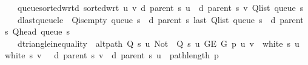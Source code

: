 \begin{isabellebody}
\ \ \ queue{\isacharunderscore}{\kern0pt}sorted{\isacharunderscore}{\kern0pt}wrt{\isacharunderscore}{\kern0pt}d{\isacharcolon}{\kern0pt}\ {\isachardoublequoteopen}sorted{\isacharunderscore}{\kern0pt}wrt\ {\isacharparenleft}{\kern0pt}{\isasymlambda}u\ v{\isachardot}{\kern0pt}\ d\ {\isacharparenleft}{\kern0pt}parent\ s{\isacharparenright}{\kern0pt}\ u\ {\isasymle}\ d\ {\isacharparenleft}{\kern0pt}parent\ s{\isacharparenright}{\kern0pt}\ v{\isacharparenright}{\kern0pt}\ {\isacharparenleft}{\kern0pt}Q{\isacharunderscore}{\kern0pt}list\ {\isacharparenleft}{\kern0pt}queue\ s{\isacharparenright}{\kern0pt}{\isacharparenright}{\kern0pt}{\isachardoublequoteclose}\isanewline
\ \ \ d{\isacharunderscore}{\kern0pt}last{\isacharunderscore}{\kern0pt}queue{\isacharunderscore}{\kern0pt}le{\isacharcolon}{\kern0pt}\ {\isachardoublequoteopen}{\isasymnot}\ Q{\isacharunderscore}{\kern0pt}is{\isacharunderscore}{\kern0pt}empty\ {\isacharparenleft}{\kern0pt}queue\ s{\isacharparenright}{\kern0pt}\ {\isasymLongrightarrow}\ d\ {\isacharparenleft}{\kern0pt}parent\ s{\isacharparenright}{\kern0pt}\ {\isacharparenleft}{\kern0pt}last\ {\isacharparenleft}{\kern0pt}Q{\isacharunderscore}{\kern0pt}list\ {\isacharparenleft}{\kern0pt}queue\ s{\isacharparenright}{\kern0pt}{\isacharparenright}{\kern0pt}{\isacharparenright}{\kern0pt}\ {\isasymle}\ d\ {\isacharparenleft}{\kern0pt}parent\ s{\isacharparenright}{\kern0pt}\ {\isacharparenleft}{\kern0pt}Q{\isacharunderscore}{\kern0pt}head\ {\isacharparenleft}{\kern0pt}queue\ s{\isacharparenright}{\kern0pt}{\isacharparenright}{\kern0pt}\ {\isacharplus}{\kern0pt}\ {}{\isachardoublequoteclose}\isanewline
\ \ \ d{\isacharunderscore}{\kern0pt}triangle{\isacharunderscore}{\kern0pt}inequality{\isacharcolon}{\kern0pt}\ {\isachardoublequoteopen}{\isasymlbrakk}\ alt{\isacharunderscore}{\kern0pt}path\ {\isacharparenleft}{\kern0pt}Q\ s\ u{\isacharparenright}{\kern0pt}\ {\isacharparenleft}{\kern0pt}Not\ {\isasymcirc}\ Q\ s\ u{\isacharparenright}{\kern0pt}\ {\isacharparenleft}{\kern0pt}G{\isachardot}{\kern0pt}E\ G{\isacharparenright}{\kern0pt}\ p\ u\ v{\isacharsemicolon}{\kern0pt}\ {\isasymnot}\ white\ s\ u{\isacharsemicolon}{\kern0pt}\ {\isasymnot}\ white\ s\ v\ {\isasymrbrakk}\ {\isasymLongrightarrow}\ d\ {\isacharparenleft}{\kern0pt}parent\ s{\isacharparenright}{\kern0pt}\ v\ {\isasymle}\ d\ {\isacharparenleft}{\kern0pt}parent\ s{\isacharparenright}{\kern0pt}\ u\ {\isacharplus}{\kern0pt}\ path{\isacharunderscore}{\kern0pt}length\ p{\isachardoublequoteclose}\isanewline
\isanewline
{}\isamarkupfalse%

\end{isabellebody}
